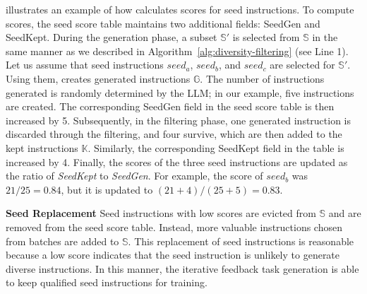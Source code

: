  illustrates an example of how \ours{} calculates
scores for seed instructions. To compute scores, 
the seed score table maintains two additional fields: 
SeedGen and SeedKept.
During the generation phase, a subset $\mathbb{S}'$ 
is selected from $\mathbb{S}$ in the same manner as we described
in Algorithm~\ref{alg:diversity-filtering} (see Line 1). 
Let us assume that seed instructions $seed_a$, $seed_b$, and $seed_c$ are
selected for $\mathbb{S}'$. 
Using them, \ours{} creates generated instructions $\mathbb{G}$. 
The number of instructions generated is randomly determined by the LLM;
in our example, five instructions are created.
The corresponding SeedGen field 
in the seed score table is then increased by 5.
Subsequently, in the filtering phase, 
one generated instruction is discarded through the filtering, and four survive,
which are then added to the kept instructions $\mathbb{K}$. 
Similarly, the corresponding SeedKept field in the table 
is increased by 4.
Finally, the scores of the three seed instructions are updated 
as the ratio of \textit{SeedKept} to \textit{SeedGen}. For example, the score of $seed_b$ was $21/25 = 0.84$, but it is updated to $(21+4)/(25+5) = 0.83$.

\textbf{Seed Replacement}
Seed instructions with low scores are evicted from $\mathbb{S}$
and are removed from the seed score table. 
Instead, more valuable instructions chosen from batches are added to $\mathbb{S}$.
This replacement of seed instructions is reasonable 
because a low score indicates that the seed instruction is unlikely to
generate diverse instructions.
In this manner, the iterative feedback task generation 
is able to keep qualified seed instructions for training.






